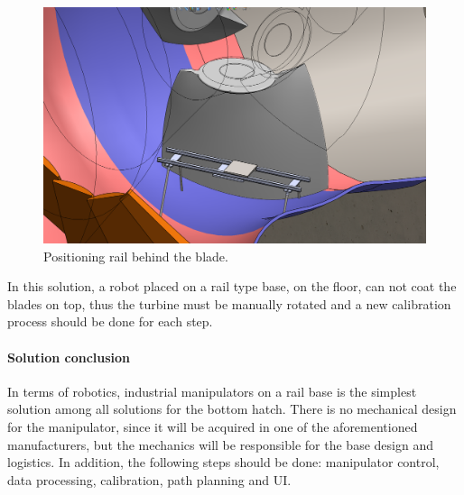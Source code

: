 \begin{figure}[h!]	
	\includegraphics[width=\columnwidth]{figs/manipuladores/rail2.PNG}
	\caption{Positioning rail behind the blade.}
	\label{fig::rail2}
\end{figure}

In this solution, a robot placed on a rail type base, on the floor, can not coat
the blades on top, thus the turbine must be manually rotated and a new
calibration process should be done for each step.


\paragraph{Solution conclusion}
In terms of robotics, industrial manipulators on a rail base is the simplest
solution among all solutions for the bottom hatch. There is no
mechanical design for the manipulator, since it will be acquired in one of the
aforementioned manufacturers, but the mechanics will be responsible for the base
design and logistics. In addition, the following steps should be done:
manipulator control, data processing, calibration, path planning and UI.

